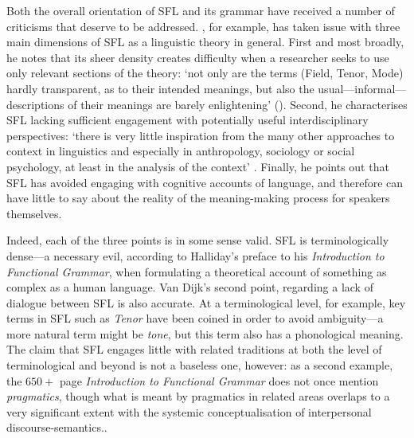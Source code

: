 Both the overall orientation of \gls{SFL} and its grammar have received a number of criticisms that deserve to be addressed. \textcite{van_dijk_text_2004}, for example, has taken issue with three main dimensions of \gls{SFL} as a linguistic theory in general. First and most broadly, he notes that its sheer density creates difficulty when a researcher seeks to use only relevant sections of the theory:  `not only are the terms (Field, Tenor, Mode) hardly transparent, as to their intended meanings, but also the usual---informal---descriptions of their meanings are barely enlightening' (\citeyear[p.~341]{van_dijk_text_2004}). Second, he characterises \gls{SFL} lacking sufficient engagement with potentially useful interdisciplinary perspectives: `there is very little inspiration from the many other approaches to context in linguistics and especially in anthropology, sociology or social psychology, at least in the analysis of the context' \parencite*[p.~342]{van_dijk_text_2004}. Finally, he points out that \gls{SFL} has avoided engaging with cognitive accounts of language, and therefore can have little to say about the reality of the meaning\hyp{}making process for speakers themselves.

Indeed, each of the three points is in some sense valid. \gls{SFL} is terminologically dense---a necessary evil, according to Halliday's preface to his \emph{Introduction to Functional Grammar}, when formulating a theoretical account of something as complex as a human language.  Van Dijk's second point, regarding a lack of dialogue between \gls{SFL} is also accurate. At a terminological level, for example, key terms in \gls{SFL} such as \emph{Tenor} have been coined in order to avoid ambiguity---a more natural term might be \emph{tone}, but this term also has a phonological meaning. The claim that \gls{SFL} engages little with related traditions at both the level of terminological and beyond is not a baseless one, however: as a second example, the $650+$ page \emph{Introduction to Functional Grammar} does not once mention \emph{pragmatics}, though what is meant by pragmatics in related areas overlaps to a very significant extent with the systemic conceptualisation of interpersonal \glspl{discourse-semantic}..


